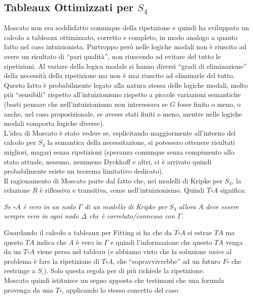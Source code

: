 \documentclass[a4paper,12pt, oneside]{book}
\begin{document}
\subsection{Tableaux Ottimizzati per $S_4$}
Moscato non era soddisfatto comunque della ripetizione e quindi ha sviluppato un
calcolo a tableaux ottimizzato, corretto e completo, in modo analogo a quanto
fatto nel caso intuizionista. Purtroppo però nelle logiche modali non è riuscito
ad avere un risultato di ``pari qualità'', non riuscendo ad evitare del tutto le
ripetizioni. Al variare della logica modale si hanno diversi ``gradi di
eliminazione'' della necessità della ripetizione ma non è mai riuscito ad
eliminarle del tutto. Questo fatto è probabilmente legato alla natura stessa
delle logiche modali, molto più ``sensibili'' rispetto all'intuizionismo
rispetto a piccole variazioni semantiche (basti pensare che nell'intuizionismo
non interessava se $G$ fosse finito o meno, o anche, nel caso proposizionale, se
avesse stati finiti o meno, mentre nelle logiche modali comporta logiche
diverse). \\
L'idea di Moscato è stato vedere se, esplicitando maggiormente all'interno del
calcolo per $S_4$ la semantica della necessitazione, si potessero ottenere
risultati migliori, magari senza ripetizioni (speranza comunque senza compimento
allo stato attuale, nessuno, nemmeno Dyckhoff e altri, ci è arrivato quindi
probabilmente esiste un teorema limitativo dedicato). \\
Il ragionamento di Moscato parte dal fatto che, nei modelli di Kripke per $S_4$,
la relazione $R$ è riflessiva e transitiva, come nell'intuizionismo. Quindi
$T\square A$ significa:
\begin{center}
  \textit{Se $\square A$ è vero in un nodo $\Gamma$ di un modello di Kripke per
    $S_4$ allora $A$ deve essere sempre vero in ogni nodo $\Delta$ che è
    correlato/connesso con $\Gamma$}.
\end{center}
Guardando il calcolo a tableaux per Fitting si ha che da $T\square A$ si estrae
$TA$ ma questo $TA$ indica che $A$ è vero in $\Gamma$ e quindi
l'informazione che questo $TA$ venga da un $T\square A$ viene persa nel
tableau (e abbiamo visto che la soluzione \textit{naive} al problema è fare la
ripetizione di $T\square A$, che ``sopravvivrebbe'' ad un futuro $F\square$ che
restringe a $S_\square$). Solo questa regola per di più richiede la
ripetizione.\\ 
Moscato quindi istituisce un segno apposta che testimoni che una formula
provenga da una $T\square$, applicando lo stesso concetto del caso
\end{document}
